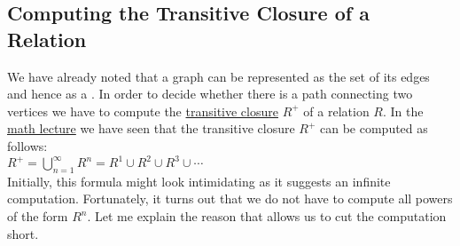 \subsection{Computing the Transitive Closure of a Relation}
We have already noted that a graph can be represented as the set of its edges and hence as a .
In order to decide whether there is a path connecting two vertices we have to compute the 
\href{https://en.wikipedia.org/wiki/Transitive_closure}{transitive closure} $R^+$ of a relation $R$.  
In the \href{https://github.com/karlstroetmann/Lineare-Algebra/blob/master/Script/lineare-algebra.pdf}{math lecture}
we have seen that the transitive closure $R^+$ can be computed as follows:
\\[0.2cm]
\hspace*{1.3cm}
$R^+ = \bigcup\limits_{n=1}^{\infty} R^n = R^1 \cup R^2 \cup R^3 \cup \cdots$  
\\[0.2cm]
Initially, this formula might look intimidating as it suggests an infinite computation.
Fortunately, it turns out that we do not have to compute all powers of the form $R^n$.  Let me
explain the reason that allows us to cut the computation short.  
